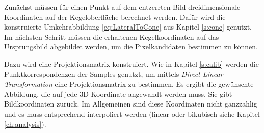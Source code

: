 Zunächst müssen für einen Punkt auf dem entzerrten Bild dreidimensionale Koordinaten auf der Kegeloberfläche berechnet werden. Dafür wird die konstruierte Umkehrabbildung \ref{eq:LateralToCone} aus Kapitel \ref{s:cone} genutzt. Im nächsten Schritt müssen die erhaltenen Kegelkoordinaten auf das Ursprungsbild abgebildet werden, um die Pixelkandidaten bestimmen zu können.

Dazu wird eine Projektionsmatrix konstruiert. Wie in Kapitel \ref{s:calib} werden die  Punktkorrespondenzen der Samples genutzt, um mittels \textit{Direct Linear Transformation} eine Projektionsmatrix zu bestimmen.
Es ergibt die gewünschte Abbildung, die auf jede 3D-Koordinate angewandt werden muss. Sie gibt Bildkoordinaten zurück. Im Allgemeinen sind diese Koordinaten nicht ganzzahlig und es muss entsprechend interpoliert werden (linear oder bikubisch siehe Kapitel \ref{ch:analysis}).

